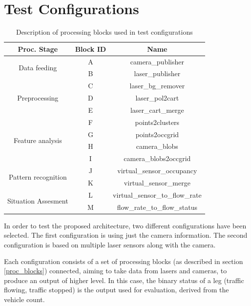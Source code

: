 \section{Test Configurations}

\begin{table}[ht!]
\footnotesize
\centering
\begin{tabular}{|c | c| c|}
\hline
\textbf{Proc. Stage} & \textbf{Block ID} & \textbf{Name} \\
\hline

\multirow{2}{*}{Data feeding} &
A & camera\_publisher \\
\cline{2-3} 
& B & laser\_publisher \\
\hline

\multirow{3}{*}{Preprocessing} &
C & laser\_bg\_remover \\
\cline{2-3}
& D & laser\_pol2cart \\
\cline{2-3}
& E & laser\_cart\_merge \\
\hline

\multirow{4}{*}{Feature analysis} &
F & points2clusters \\
\cline{2-3}
& G & points2occgrid \\
\cline{2-3}
& H & camera\_blobs \\
\cline{2-3}
& I & camera\_blobs2occgrid \\
\hline

\multirow{2}{*}{Pattern recognition} &
J & virtual\_sensor\_occupancy \\
\cline{2-3}
& K & virtual\_sensor\_merge \\
\hline

\multirow{2}{*}{Situation Assesment} &
L & virtual\_sensor\_to\_flow\_rate \\
\cline{2-3}
& M & flow\_rate\_to\_flow\_status \\
\hline

\end{tabular}
\caption{Description of processing blocks used in test configurations}
\label{desc_test_config}
\end{table}

In order to test the proposed architecture, two different configurations have been selected. The first configuration is using just the camera information. The second configuration is based on multiple laser sensors along with the camera.

Each configuration consists of a set of processing blocks (as described in section \ref{proc_blocks}) connected, aiming to take data from  lasers and cameras, to produce an output of higher level. In this case, the binary status of a leg (traffic flowing, traffic stopped) is the output used for evaluation, derived from the vehicle count.

